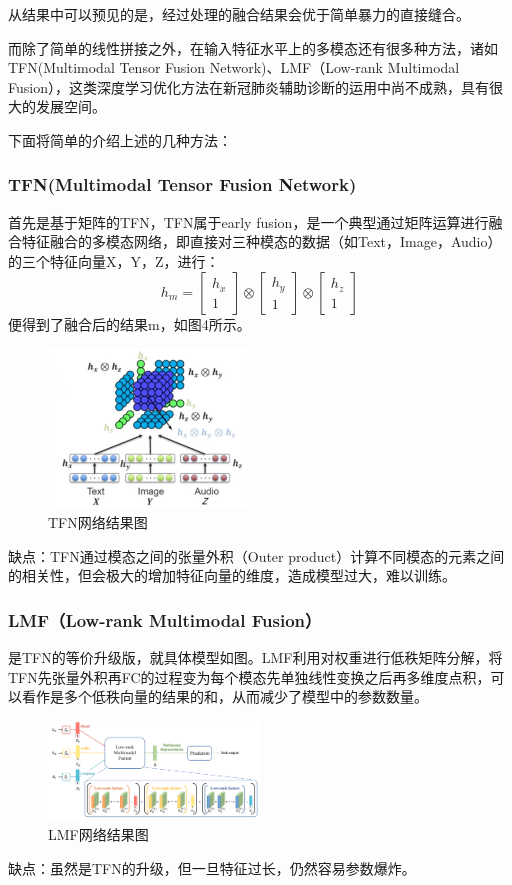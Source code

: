 \documentclass[journal,twoside,web]{ieeecolor}
\begin{document}
从结果中可以预见的是，经过处理的融合结果会优于简单暴力的直接缝合。

而除了简单的线性拼接之外，在输入特征水平上的多模态还有很多种方法，诸如TFN(Multimodal Tensor Fusion Network)、LMF（Low-rank Multimodal Fusion），这类深度学习优化方法在新冠肺炎辅助诊断的运用中尚不成熟，具有很大的发展空间。

下面将简单的介绍上述的几种方法：
\subsubsection{TFN(Multimodal Tensor Fusion Network)}
首先是基于矩阵的TFN，TFN属于early fusion，是一个典型通过矩阵运算进行融合特征融合的多模态网络，即直接对三种模态的数据（如Text，Image，Audio）的三个特征向量X，Y，Z，进行：
\begin{equation}
h_{m}=\left[\begin{array}{c}
h_{x} \\
1
\end{array}\right] \otimes\left[\begin{array}{c}
h_{y} \\
1
\end{array}\right] \otimes\left[\begin{array}{c}
h_{z} \\
1
\end{array}\right]
\end{equation}
便得到了融合后的结果m，如图4所示。
\begin{figure}[h]
\centering
\includegraphics[width=0.5\textwidth]{img/fig6.png}
\caption{TFN网络结果图}
\label{fig:TFN}
\end{figure}
缺点：TFN通过模态之间的张量外积（Outer product）计算不同模态的元素之间的相关性，但会极大的增加特征向量的维度，造成模型过大，难以训练。
\subsubsection{LMF（Low-rank Multimodal Fusion）}
是TFN的等价升级版，就具体模型如图。LMF利用对权重进行低秩矩阵分解，将TFN先张量外积再FC的过程变为每个模态先单独线性变换之后再多维度点积，可以看作是多个低秩向量的结果的和，从而减少了模型中的参数数量。
\begin{figure}[h]
\centering
\includegraphics[width=0.5\textwidth]{img/fig7.png}
\caption{LMF网络结果图}
\label{fig:LMF}
\end{figure}
缺点：虽然是TFN的升级，但一旦特征过长，仍然容易参数爆炸。
\end{document}
